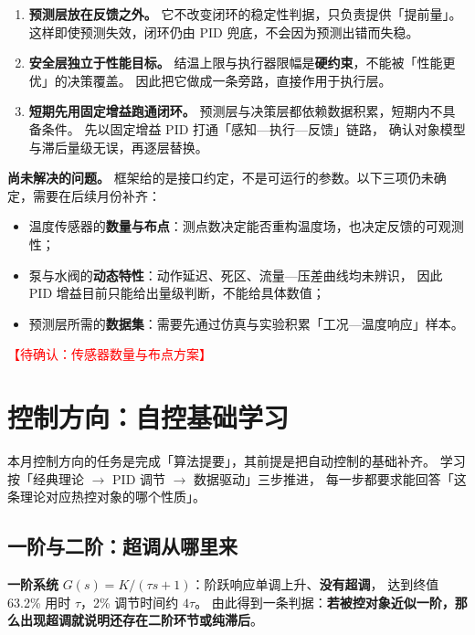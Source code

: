 \documentclass[stage1,fontset=fandol]{ydzjreport}
\begin{document}
	\begin{enumerate}
		\item \textbf{预测层放在反馈之外。}
		它不改变闭环的稳定性判据，只负责提供「提前量」。
		这样即使预测失效，闭环仍由 PID 兜底，不会因为预测出错而失稳。
		\item \textbf{安全层独立于性能目标。}
		结温上限与执行器限幅是\textbf{硬约束}，不能被「性能更优」的决策覆盖。
		因此把它做成一条旁路，直接作用于执行层。
		\item \textbf{短期先用固定增益跑通闭环。}
		预测层与决策层都依赖数据积累，短期内不具备条件。
		先以固定增益 PID 打通「感知—执行—反馈」链路，
		确认对象模型与滞后量级无误，再逐层替换。
	\end{enumerate}
	
	\textbf{尚未解决的问题。}
	框架给的是接口约定，不是可运行的参数。以下三项仍未确定，需要在后续月份补齐：
	
	\begin{itemize}
		\item 温度传感器的\textbf{数量与布点}：测点数决定能否重构温度场，也决定反馈的可观测性；
		\item 泵与水阀的\textbf{动态特性}：动作延迟、死区、流量—压差曲线均未辨识，
		因此 PID 增益目前只能给出量级判断，不能给具体数值；
		\item 预测层所需的\textbf{数据集}：需要先通过仿真与实验积累「工况—温度响应」样本。
	\end{itemize}
	
	\textcolor{red}{【待确认：传感器数量与布点方案】}
	
	\section{控制方向：自控基础学习}
	
	本月控制方向的任务是完成「算法提要」，其前提是把自动控制的基础补齐。
	学习按「经典理论 $\rightarrow$ PID 调节 $\rightarrow$ 数据驱动」三步推进，
	每一步都要求能回答「这条理论对应热控对象的哪个性质」。
	
	\subsection{一阶与二阶：超调从哪里来}
	
	\textbf{一阶系统} $G(s)=K/(\tau s+1)$：阶跃响应单调上升、\textbf{没有超调}，
	达到终值 63.2\% 用时 $\tau$，2\% 调节时间约 $4\tau$。
	由此得到一条判据：\textbf{若被控对象近似一阶，那么出现超调就说明还存在二阶环节或纯滞后}。
	
\end{document}
